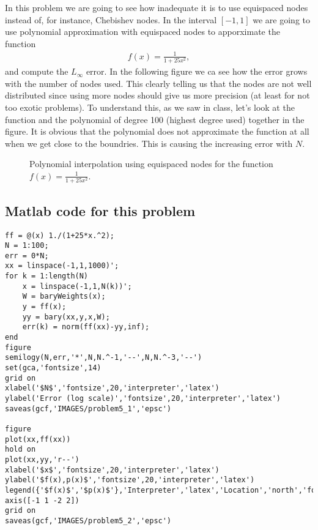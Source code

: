 \begin{solution}
In this problem we are going to see how inadequate it is to use equispaced nodes instead of, for instance, Chebishev nodes. In the interval $[-1,1]$ we are going to use polynomial approximation with equispaced nodes to apporximate the function 
\begin{align*}
f(x)=\frac{1}{1+25x^2},
\end{align*}
and compute the $L_{\infty}$ error. In the following figure we ca see how the error grows with the number of nodes used. This clearly telling us that the nodes are not well distributed since using more nodes should give us more precision (at least for not too exotic problems). To understand this, as we saw in class, let's look at the function and the polynomial of degree 100 (highest degree used) together in the figure. It is obvious that the polynomial does not approximate the function at all when we get close to the boundries. This is causing the increasing error with $N$.

\begin{figure}[H]
\centering     %
\hspace*{\fill}
\hfill
{}
\hspace*{\fill}
\caption{Polynomial interpolation using equispaced nodes for the function $f(x)=\frac{1}{1+25x^2}$.}
\end{figure}
\subsection*{Matlab code for this problem}
\begin{verbatim}
ff = @(x) 1./(1+25*x.^2);
N = 1:100;
err = 0*N;
xx = linspace(-1,1,1000)';
for k = 1:length(N)
    x = linspace(-1,1,N(k))';
    W = baryWeights(x);
    y = ff(x);
    yy = bary(xx,y,x,W);
    err(k) = norm(ff(xx)-yy,inf);
end
figure
semilogy(N,err,'*',N,N.^-1,'--',N,N.^-3,'--')
set(gca,'fontsize',14)
grid on
xlabel('$N$','fontsize',20,'interpreter','latex')
ylabel('Error (log scale)','fontsize',20,'interpreter','latex')
saveas(gcf,'IMAGES/problem5_1','epsc')

figure
plot(xx,ff(xx))
hold on
plot(xx,yy,'r--')
xlabel('$x$','fontsize',20,'interpreter','latex')
ylabel('$f(x),p(x)$','fontsize',20,'interpreter','latex')
legend({'$f(x)$','$p(x)$'},'Interpreter','latex','Location','north','fontsize',16)
axis([-1 1 -2 2])
grid on
saveas(gcf,'IMAGES/problem5_2','epsc')
\end{verbatim}
\end{solution}

